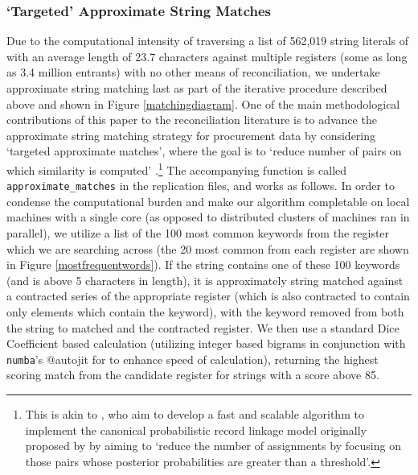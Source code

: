 \documentclass[11pt]{article}
\begin{document}
\subsubsection{`Targeted' Approximate String Matches}

Due to the computational intensity of traversing a list of 562,019 string literals of with an average length of 23.7 characters against multiple registers (some as long as 3.4 million entrants) with no other means of reconciliation, we undertake approximate string matching last as part of the iterative procedure described above and shown in Figure \ref{matchingdiagram}. One of the main methodological contributions of this paper to the reconciliation literature is to advance the approximate string matching strategy for procurement data by considering `targeted approximate matches', where the goal is to `reduce number of pairs on which similarity is computed' \citep{Koudas:2006:RLS:1142473.1142599}.\footnote{This is akin to \cite{imai2017}, who aim to develop a fast and scalable algorithm to implement  the canonical probabilistic record linkage model originally proposed by \cite{doi:10.1080/01621459.1969.10501049} by aiming to `reduce the number of assignments by focusing on those pairs whose posterior probabilities are greater than a threshold'.} The accompanying function is called \texttt{approximate\_matches} in the replication files, and works as follows. In order to condense the computational burden and make our algorithm completable on local machines with a single core (as opposed to distributed clusters of machines ran in parallel), we utilize a list of the 100 most common keywords from the register which we are searching across (the 20 most common from each register are shown in Figure \ref{mostfrequentwords}). If the string contains one of these 100 keywords (and is above 5 characters in length), it is approximately string matched against a contracted series of the appropriate register (which is also contracted to contain only elements which contain the keyword), with the keyword removed from both the string to matched and the contracted register. We then use a standard Dice Coefficient based calculation (utilizing integer based bigrams in conjunction with \texttt{numba}'s @autojit for to enhance speed of calculation), returning the highest scoring match from the candidate register for strings with a score above 85. 
\end{document}
